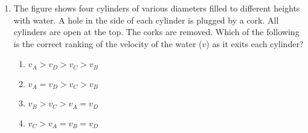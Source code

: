 \documentclass{../../../oss-apphys}
\begin{document}
\genheader


\genmultidirections

\gengravity

\raggedcolumns
\begin{multicols}{2}

  \begin{enumerate}[leftmargin=18pt]

%    
%
  \item The figure shows four cylinders of various diameters filled to different
    heights with water. A hole in the side of each cylinder is plugged by a
    cork. All cylinders are open at the top. The corks are removed. Which
    of the following is the correct ranking of the velocity of the water ($v$)
    as it exits each cylinder?
    
    \begin{enumerate}[noitemsep,topsep=0pt,leftmargin=18pt,label=(\Alph*)]
    \item $v_A > v_D > v_C > v_B$
    \item $v_A = v_D > v_C > v_B$
    \item $v_B > v_C > v_A = v_D$
    \item $v_C > v_A = v_B = v_D$
    \end{enumerate}
  

\end{enumerate}
\end{multicols}
\end{document}
